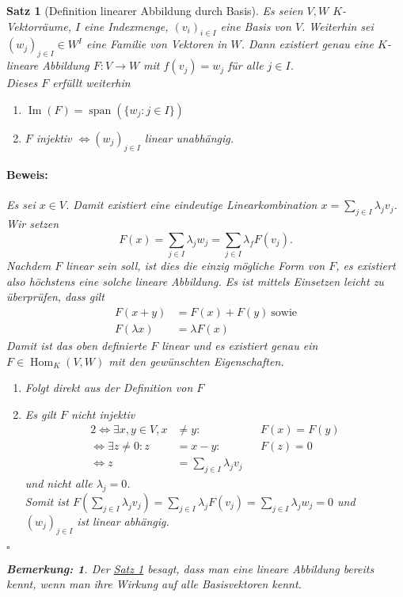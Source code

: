 \documentclass{report}
\newcommand{\lb}{\lambda}
\DeclareMathOperator{\Span}{span}
\DeclareMathOperator{\Hom}{Hom}
\DeclareMathOperator{\Ima}{Im}
\theoremstyle{customrem}
\newtheorem*{bem}{Bemerkung:}
\theoremstyle{customdef}
\newtheorem{satz}[definition]{Satz}
\renewenvironment{proof}{\vspace{-.75cm}\paragraph{Beweis: }}{\vspace{-.5cm}\hfill$\square$}
\begin{document}
	\begin{satz}[Definition linearer Abbildung durch Basis]
		\label{satz33}
		Es seien $V, W$ $K$-Vektorräume, $I$ eine Indexmenge, $(v_i)_{i \in I}$ eine Basis von $V$. Weiterhin sei $(w_j)_{j \in I} \in W^I$ eine Familie von Vektoren in $W$. Dann existiert genau eine $K$-lineare Abbildung $F : V \to W$ mit $f(v_j) = w_j$ für alle $j \in I$.\\
		
		\noindent Dieses $F$ erfüllt weiterhin
		\begin{enumerate}[leftmargin = 4cm]
			\item $\Ima(F) = \Span(\{w_j : j \in I\})$
			\item $F$ injektiv $\Leftrightarrow (w_j)_{j \in I}$ linear unabhängig.
		\end{enumerate}
		
		\begin{proof}
			Es sei $x \in V$. Damit existiert eine eindeutige Linearkombination $x = \sum_{j \in I} \lb_j v_j$. Wir setzen $$F(x) = \sum_{j \in I}\lb_jw_j = \sum_{j \in I} \lb_fF(v_j).$$ Nachdem $F$ linear sein soll, ist dies die einzig mögliche Form von $F$, es existiert also höchstens eine solche lineare Abbildung. Es ist mittels Einsetzen leicht zu überprüfen, dass gilt
			\begin{align*}
				F(x + y) &= F(x) + F(y)\ \text{sowie}\\
				F(\lb x) &= \lb F(x)
			\end{align*}
			Damit ist das oben definierte $F$ linear und es existiert genau ein $F \in \Hom_K(V, W)$ mit den gewünschten Eigenschaften.
			\begin{enumerate}[leftmargin=2cm]
				\item[Zu 1.:]Folgt direkt aus der Definition von $F$
				\item[Zu 2.:]Es gilt $F$ nicht injektiv 
				\begin{alignat*}{2}
					\Leftrightarrow \exists x, y \in V, x &\neq y : && F(x) = F(y)\\
					\Leftrightarrow \exists z \neq 0 : z &= x - y : && F(z) = 0\\
					\Leftrightarrow z &= \sum_{j \in I} \lb_j v_j
				\end{alignat*}
				und nicht alle $\lb_j = 0$.\\
				Somit ist $F\left(\sum_{j \in I}\lb_j v_j\right) = \sum_{j \in I} \lb_j F(v_j) = \sum_{j \in I} \lb_j w_j = 0$ und $(w_j)_{j \in I}$ ist linear abhängig.\\
			\end{enumerate}
		\end{proof}
		
		\begin{bem}
			Der \hyperref[satz33]{Satz \ref{satz33}} besagt, dass man eine lineare Abbildung bereits kennt, wenn man ihre Wirkung auf alle Basisvektoren kennt. 
		\end{bem}
	\end{satz}
	
\end{document}
